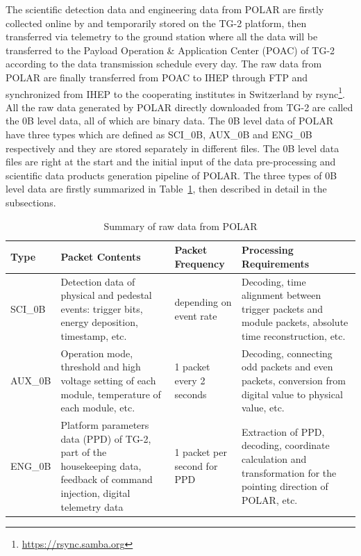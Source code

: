 \documentclass{raa}
\begin{document}
The scientific detection data and engineering data from POLAR are firstly collected online by and temporarily stored on the TG-2 platform, then transferred via telemetry to the ground station where all the data will be transferred to the Payload Operation \& Application Center (POAC) of TG-2 according to the data transmission schedule every day. The raw data from POLAR are finally transferred from POAC to IHEP through FTP and synchronized from IHEP to the cooperating institutes in Switzerland by rsync\footnote{\url{https://rsync.samba.org}}. All the raw data generated by POLAR directly downloaded from TG-2 are called the 0B level data, all of which are binary data. The 0B level data of POLAR have three types which are defined as SCI\_0B, AUX\_0B and ENG\_0B respectively and they are stored separately in different files. The 0B level data files are right at the start and the initial input of the data pre-processing and scientific data products generation pipeline of POLAR. The three types of 0B level data are firstly summarized in Table~\ref{tab:raw_data}, then described in detail in the subsections. 

\begin{table}[!ht]
\centering
\caption{Summary of raw data from POLAR}\label{tab:raw_data}
\begin{tabular}{|p{1.2cm}|p{4.5cm}|p{2.5cm}|p{4.5cm}|}\hline
Type & Packet Contents & Packet Frequency & Processing Requirements \\\hline
SCI\_0B & Detection data of physical and pedestal events: trigger bits, energy deposition, timestamp, etc. & depending on event rate & Decoding, time alignment between trigger packets and module packets, absolute time reconstruction, etc.  \\\hline
AUX\_0B & Operation mode, threshold and high voltage setting of each module, temperature of each module, etc. & 1 packet every 2 seconds & Decoding, connecting odd packets and even packets, conversion from digital value to physical value, etc. \\\hline
ENG\_0B & Platform parameters data (PPD) of TG-2, part of the housekeeping data, feedback of command injection, digital telemetry data & 1 packet per second for PPD & Extraction of PPD, decoding, coordinate calculation and transformation for the pointing direction of POLAR, etc.\\\hline
\end{tabular}
\end{table}
\end{document}
